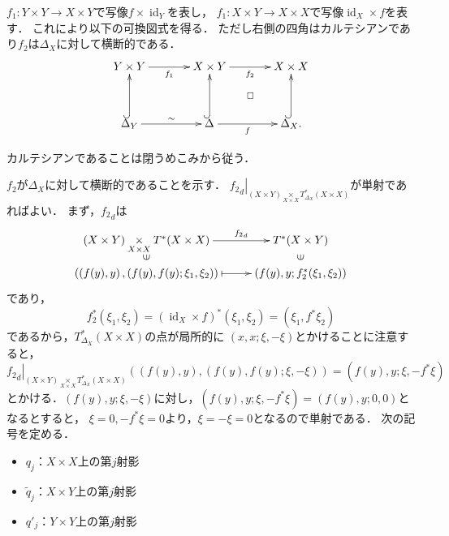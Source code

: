 \documentclass[leqno, 10pt, a4paper, dvipdfmx]{jsarticle}
\makeatletter
\theoremstyle{definition}
\renewenvironment{proof}[1][\proofname]{\par
  \pushQED{\qed}%
  \normalfont \topsep6\p@\@plus6\p@\relax
  \trivlist
  \item[\hskip\labelsep
         \bfseries
    {#1}]\ignorespaces
}{%
  \popQED\endtrivlist\@endpefalse
}
\renewcommand{\proofname}{証明.}
\numberwithin{equation}{section}
\newcommand{\id}{\mathop{\mathrm{id}}\nolimits}
\newcommand{\mres}[2][]{{\left.{#1}\right\rvert}_{#2}}
\newcommand{\pb}[1][]{\mathbin{\mathop{\times}\limits_{#1}}}
\theoremstyle{mystyle}
\newcommand{\mdiff}[1][]{{#1}_{d}} %
\newcommand{\diag}[1][]{\Delta_{#1}}
\makeatother
\begin{document}
\(f_1\colon Y\times Y\to X\times Y\)で写像\(f\times \id_Y\)を表し，
\(f_1\colon X\times Y\to X\times X\)で写像\(\id_X\times f\)を表す．
これにより以下の可換図式を得る．
ただし右側の四角はカルテシアンであり\(f_2\)は\(\diag[X]\)に対して横断的である．
\begin{equation}\label{eq:4.4.3}
  \vcenter{\xymatrix@C=36pt@R=36pt{
    Y\times Y
    \ar[r]_-{f_1}
    &
    X\times Y
    \ar@{}[rd]|\square
    \ar[r]_-{f_2}
    &
    X\times X
    \\
    \diag[Y]  
    \ar@{^{(}->}[u]^-{}
    \ar[r]^-{{\sim}}
    &
    \diag[]
    \ar@{^{(}->}[u]^-{}
    \ar[r]_-{f}
    &
    \diag[X].
    \ar@{^{(}->}[u]^-{}
  }}
\end{equation}
\begin{proof}
  カルテシアンであることは閉うめこみから従う．

  \(f_2\)が\(\diag[X]\)に対して横断的であることを示す．
  \(\mres[{\mdiff[f_2]}]{(X\times Y)\pb[X\times X]T^{\ast}_{\diag[X]}(X\times X)}\)が単射であればよい．
  まず，\(\mdiff[f_2]\)は
  \[    
    \vcenter{\xymatrix@C=26pt@R=10pt{
      (X\times Y)\pb[X\times X]T^{\ast}(X\times X)
      \ar[r]^-{\mdiff[f_2]}
      &
      T^{\ast}(X\times Y)
      \\
      \left(\left(f(y),y\right),(f(y),f(y);\xi_1,\xi_2)\right)
      \ar@{}[u]|{\rotatebox{90}{\(\in\)}}
      \ar@{{|}->}[r]_-{}
      &
      \ar@{}[u]|{\rotatebox{90}{\(\in\)}}
      \left(f(y),y;f_{2}^{\ast}(\xi_1,\xi_2)\right)
    }}
  \]であり，
  \[
    f_2^{\ast}(\xi_1,\xi_2)
    =
    (\id_X\times f)^{\ast}(\xi_1,\xi_2)
    =(\xi_1,f^{\ast}\xi_2)
  \]であるから，\(T^{\ast}_{\diag[X]}(X\times X)\)の点が局所的に
  \((x,x;\xi,-\xi)\)とかけることに注意すると，
  \[
    \mres[{\mdiff[f_2]}]{(X\times Y)\pb[X\times X]T^{\ast}_{\diag[X]}(X\times X)}
    \left(\left(f(y),y\right),(f(y),f(y);\xi,-\xi)\right)
    =(f(y),y;\xi,-f^{\ast}\xi)
  \]
  とかける．\((f(y),y;\xi,-\xi)\)に対し，\((f(y),y;\xi,-f^{\ast}\xi)=(f(y),y;0,0)\)となるとすると，
  \(\xi=0,-f^{\ast}\xi=0\)より，\(\xi=-\xi=0\)となるので単射である．
\end{proof}
次の記号を定める．
\begin{itemize}
  \item \(q_j\)：\(X\times X\)上の第\(j\)射影
  \item \(\tilde{q}_{j}\)：\(X\times Y\)上の第\(j\)射影
  \item \(q'_j\)：\(Y\times Y\)上の第\(j\)射影
\end{itemize}
\end{document}
